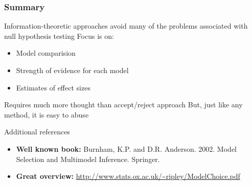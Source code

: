 \documentclass[color=usenames,dvipsnames]{beamer}\usepackage[]{graphicx}\usepackage[]{color}
\begin{document}
\begin{frame}
  \frametitle{Summary}
  \large
    Information-theoretic approaches avoid many of the problems
      associated with null hypothesis testing
    \pause
    \vfill
    Focus is on:
      \begin{itemize}
        \large
        \item Model comparision
        \item Strength of evidence for each model
        \item Estimates of effect sizes
      \end{itemize}
    \pause
    \vfill
    Requires much more thought than accept/reject approach
    \pause
    \vfill
    But, just like any method, it is easy to abuse
    
  \pause
  \vfill
  Additional references
  \begin{itemize}
    \item {\bf Well known book:} Burnham, K.P. and
      D.R. Anderson. 2002. Model Selection and 
      Multimodel Inference. Springer.
    \item {\bf Great overview:} \url{http://www.stats.ox.ac.uk/~ripley/ModelChoice.pdf} 
  \end{itemize}
\end{frame}
\end{document}
